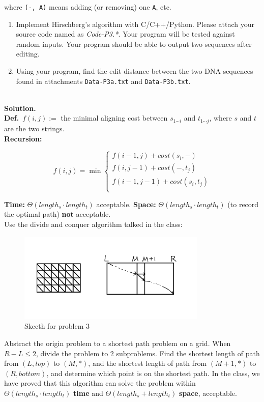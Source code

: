 \documentclass{article}
\newtheorem*{solution}{Solution}
\renewenvironment{solution}[1][Solution]{~\\ \textbf{#1.}}{~\\}
\newcommand{\myblock}[2]{\textbf{#1}\ {#2}}
\begin{document}
\begin{enumerate}
    where \texttt{(-, A)} means adding (or removing) one \texttt{A}, etc.

    \begin{enumerate}
        \item
        Implement Hirschberg's algorithm with C/C++/Python. Please attach your source code named as {\color{red}\emph{Code-P3.*}}. Your program will be tested against random inputs. Your program should be able to output two sequences after editing.

        \item
        Using your program, find the edit distance between the two DNA sequences found in attachments \texttt{Data-P3a.txt} and \texttt{Data-P3b.txt}.
    \end{enumerate}
\begin{solution}\\
\myblock{Def.}{$f(i,j) := $ the minimal aligning cost between $s_{1\cdots i}$ and $t_{1\cdots j}$, where $s$ and $t$ are the two strings.}\\
\myblock{Recursion:}{\begin{spacing}{1.2}$$f(i, j) = \min\left\{\begin{array}{l}f(i-1,j)+cost(s_i,-)\\f(i,j-1)+cost(-,t_j)\\f(i-1,j-1)+cost(s_i,t_j)\\\end{array}\right.$$\end{spacing}}
\textbf{Time:} $\Theta(length_s\cdot length_t)$ acceptable. \textbf{Space:} $\Theta(length_s\cdot length_t)$ (to record the optimal path) \textbf{not} acceptable.\\
Use the divide and conquer algorithm talked in the class:\\
\begin{figure}[H]
\centering
\caption{Skecth for problem 3}
\includegraphics[width=0.8\textwidth]{problem3.png}
\end{figure}
Abstract the origin problem to a shortest path problem on a grid. When $R-L\leq 2$, divide the problem to 2 subproblems. Find the shortest length of path from $(L, top)$ to $(M, *)$, and the shortest length of path from $(M+1,*)$ to $(R,bottom)$, and determine which point is on the shortest path. In the class, we have proved that this algorithm can solve the problem within $\Theta(length_s\cdot length_t)$ \textbf{time} and $\Theta(length_s+length_t)$ \textbf{space}, acceptable.\\

\end{solution}
\end{enumerate}
\end{document}
